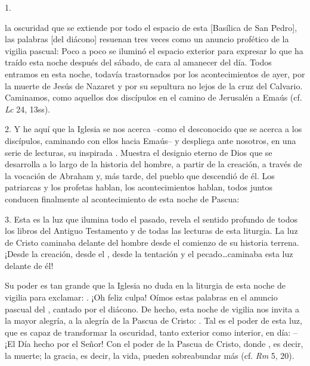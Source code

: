 \begin{body}
1. 

 la oscuridad que se extiende por todo el espacio de esta [Basílica de San Pedro], las palabras [del diácono] resuenan tres veces como un anuncio profético de la vigilia pascual:  Poco a poco se iluminó el espacio exterior para expresar lo que ha traído esta noche después del sábado, de cara al amanecer del día. Todos entramos en esta noche, todavía trastornados por los acontecimientos de ayer, por la muerte de Jesús de Nazaret y por su sepultura no lejos de la cruz del Calvario. Caminamos, como aquellos dos discípulos en el camino de Jerusalén a Emaús (cf. \textit{Lc} 24, 13ss). 

2. Y he aquí que la Iglesia se nos acerca –como el desconocido que se acerca a los discípulos, caminando con ellos hacia Emaús– y despliega ante nosotros, en una serie de lecturas, su inspirada . Muestra el designio eterno de Dios que se desarrolla a lo largo de la historia del hombre, a partir de la creación, a través de la vocación de Abraham y, más tarde, del pueblo que descendió de él. Los patriarcas y los profetas hablan, los acontecimientos hablan, todos juntos conducen finalmente al acontecimiento de esta noche de Pascua:  

3. Esta es la luz que ilumina todo el pasado, revela el sentido profundo de todos los libros del Antiguo Testamento y de todas las lecturas de esta liturgia. La luz de Cristo caminaba delante del hombre desde el comienzo de su historia terrena. ¡Desde la creación, desde el , desde la tentación y el pecado\ldots caminaba esta luz delante de él! 

Su poder es tan grande que la Iglesia no duda en la liturgia de esta noche de vigilia para exclamar: . ¡Oh feliz culpa! Oímos estas palabras en el anuncio pascual del , cantado por el diácono. De hecho, esta noche de vigilia nos invita a la mayor alegría, a la alegría de la Pascua de Cristo: . Tal es el poder de esta luz, que es capaz de transformar la oscuridad, tanto exterior como interior, en día:  – ¡El Día hecho por el Señor! Con el poder de la Pascua de Cristo, donde , es decir, la muerte; la gracia, es decir, la vida, pueden sobreabundar más (cf. \textit{Rm} 5, 20). 


\end{body}
